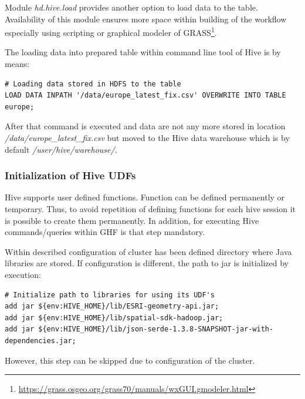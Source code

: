 \documentclass[a4paper,12pt,oneside]{report}
\begin{document}
    Module \textit{hd.hive.load} provides another option to load data to the table.
	Availability of this module ensures more space within building of the workflow
	especially using scripting or graphical modeler of
	GRASS\footnote{\url{https://grass.osgeo.org/grass70/manuals/wxGUI.gmodeler.html}}.
	
	The loading data into prepared table within command line tool of Hive is by means:
\begin{footnotesize}
	\begin{lstlisting}[style=python]
# Loading data stored in HDFS to the table
LOAD DATA INPATH '/data/europe_latest_fix.csv' OVERWRITE INTO TABLE  europe;
		\end{lstlisting}
	\end{footnotesize}
 	After that command is executed and data are not any more stored in
	location\textit{ /data/europe\_latest\_fix.csv} but moved to the Hive  data
	warehouse which is by default \textit{/user/hive/warehouse/}.




\subsubsection{Initialization of Hive UDFs}
	Hive supports user defined functions. Function can be defined permanently or
	temporary. Thus, to avoid repetition of defining functions for each hive session it
	is possible to create them permanently. In addition, for executing Hive
	commands/queries within GHF is that step mandatory.  
	
	Within described configuration of cluster has been defined directory where Java
	libraries are stored. If configuration is different, the path to jar is
	initialized by execution:
\begin{footnotesize}
	\begin{lstlisting}[style=python]
# Initialize path to libraries for using its UDF's
add jar ${env:HIVE_HOME}/lib/ESRI-geometry-api.jar;
add jar ${env:HIVE_HOME}/lib/spatial-sdk-hadoop.jar;
add jar ${env:HIVE_HOME}/lib/json-serde-1.3.8-SNAPSHOT-jar-with-dependencies.jar;
		\end{lstlisting}
	\end{footnotesize}
	However, this step can be skipped due to configuration of the cluster.
	
\end{document}
